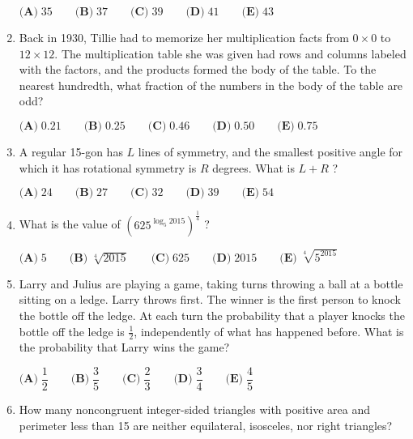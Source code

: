 \documentclass{article}
\begin{document}
\begin{enumerate}[label=\arabic*., itemsep=0.5em]
\(\textbf{(A)}\; 35 \qquad  \textbf{(B)}\; 37 \qquad \textbf{(C)}\; 39 \qquad \textbf{(D)}\; 41 \qquad \textbf{(E)}\; 43\)\par \vspace{0.5em}\item Back in 1930, Tillie had to memorize her multiplication facts from \(0 \times 0\) to \(12 \times 12\). The multiplication table she was given had rows and columns labeled with the factors, and the products formed the body of the table. To the nearest hundredth, what fraction of the numbers in the body of the table are odd?

\(\textbf{(A)}\; 0.21 \qquad\textbf{(B)}\; 0.25 \qquad\textbf{(C)}\; 0.46 \qquad\textbf{(D)}\; 0.50 \qquad\textbf{(E)}\; 0.75\)\par \vspace{0.5em}\item A regular 15-gon has \(L\) lines of symmetry, and the smallest positive angle for which it has rotational symmetry is \(R\) degrees. What is \(L+R\) ?

\(\textbf{(A)}\; 24 \qquad\textbf{(B)}\; 27 \qquad\textbf{(C)}\; 32 \qquad\textbf{(D)}\; 39 \qquad\textbf{(E)}\; 54\)\par \vspace{0.5em}\item What is the value of \((625^{\log_5 2015})^{\frac{1}{4}}\) ?

\(\textbf{(A)}\; 5 \qquad\textbf{(B)}\; \sqrt[4]{2015} \qquad\textbf{(C)}\; 625 \qquad\textbf{(D)}\; 2015 \qquad\textbf{(E)}\; \sqrt[4]{5^{2015}}\)\par \vspace{0.5em}\item Larry and Julius are playing a game, taking turns throwing a ball at a bottle sitting on a ledge. Larry throws first. The winner is the first person to knock the bottle off the ledge. At each turn the probability that a player knocks the bottle off the ledge is \(\tfrac{1}{2}\), independently of what has happened before. What is the probability that Larry wins the game?

\(\textbf{(A)}\; \dfrac{1}{2} \qquad\textbf{(B)}\; \dfrac{3}{5} \qquad\textbf{(C)}\; \dfrac{2}{3} \qquad\textbf{(D)}\; \dfrac{3}{4} \qquad\textbf{(E)}\; \dfrac{4}{5}\)\par \vspace{0.5em}\item How many noncongruent integer-sided triangles with positive area and perimeter less than 15 are neither equilateral, isosceles, nor right triangles?


\end{enumerate}
\end{document}
